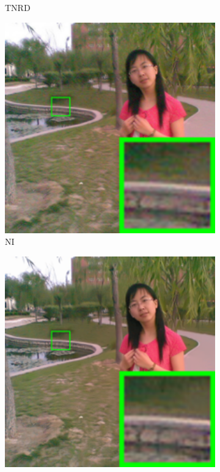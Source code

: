 \begin{figure}
\begin{subfigure}[t]{0.19\textwidth}
\caption{TNRD}
    \end{subfigure}
    \hfill
    \begin{subfigure}[t]{0.19\textwidth}
        \centering
        \includegraphics[width=1\textwidth]{images/mcwnnm/nc/resize_br_NI_chinesegirl.png}
\caption{NI}
    \end{subfigure}
\hfill
    \begin{subfigure}[t]{0.19\textwidth}
        \centering
        \includegraphics[width=1\textwidth]{images/mcwnnm/nc/resize_br_NC_chinesegirl.png}

\end{subfigure}
\end{figure}
